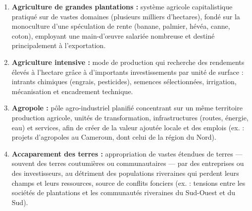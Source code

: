 \documentclass[11pt]{article}
\begin{document}
\begin{corrige}
\begin{enumerate}
\item \textbf{Agriculture de grandes plantations :} système agricole capitalistique pratiqué sur de vastes domaines (plusieurs milliers d'hectares), fondé sur la monoculture d'une spéculation de rente (banane, palmier, hévéa, canne, coton), employant une main-d'œuvre salariée nombreuse et destiné principalement à l'exportation.
\item \textbf{Agriculture intensive :} mode de production qui recherche des rendements élevés à l'hectare grâce à d'importants investissements par unité de surface : intrants chimiques (engrais, pesticides), semences sélectionnées, irrigation, mécanisation et encadrement technique.
\item \textbf{Agropole :} pôle agro-industriel planifié concentrant sur un même territoire production agricole, unités de transformation, infrastructures (routes, énergie, eau) et services, afin de créer de la valeur ajoutée locale et des emplois (ex. : projets d'agropoles au Cameroun, dont celui de la région du Nord).
\item \textbf{Accaparement des terres :} appropriation de vastes étendues de terres — souvent des terres coutumières ou communautaires — par des entreprises ou des investisseurs, au détriment des populations riveraines qui perdent leurs champs et leurs ressources, source de conflits fonciers (ex. : tensions entre les sociétés de plantations et les communautés riveraines du Sud-Ouest et du Sud).
\end{enumerate}
\end{corrige}
\end{document}
